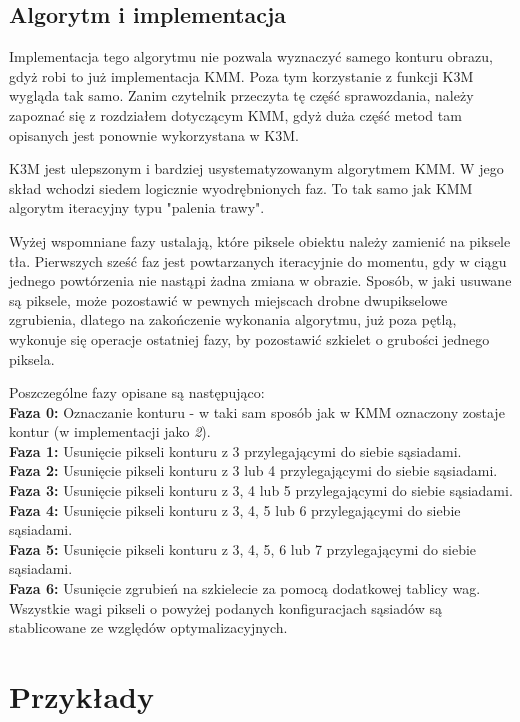 \documentclass[11pt]{article}
\begin{document}
\subsection{Algorytm i implementacja}
\par
Implementacja tego algorytmu nie pozwala wyznaczyć samego konturu obrazu, gdyż robi to już implementacja KMM. Poza tym korzystanie z funkcji K3M wygląda tak samo. Zanim czytelnik przeczyta tę część sprawozdania, należy zapoznać się z rozdziałem dotyczącym KMM, gdyż duża część metod tam opisanych jest ponownie wykorzystana w K3M.
\par
K3M jest ulepszonym i bardziej usystematyzowanym algorytmem KMM. W jego skład wchodzi siedem logicznie wyodrębnionych faz. To tak samo jak KMM algorytm iteracyjny typu "palenia trawy".
\par
Wyżej wspomniane fazy ustalają, które piksele obiektu należy zamienić na piksele tła. Pierwszych sześć faz jest powtarzanych iteracyjnie do momentu, gdy w ciągu jednego powtórzenia nie nastąpi żadna zmiana w obrazie. Sposób, w jaki usuwane są piksele, może pozostawić w pewnych miejscach drobne dwupikselowe zgrubienia, dlatego na zakończenie wykonania algorytmu, już poza pętlą, wykonuje się operacje ostatniej fazy, by pozostawić szkielet o grubości jednego piksela.
\par
Poszczególne fazy opisane są następująco: \\
\textbf{Faza 0:} Oznaczanie konturu - w taki sam sposób jak w KMM oznaczony zostaje kontur (w implementacji jako \textit{2}). \\
\textbf{Faza 1:} Usunięcie pikseli konturu z 3 przylegającymi do siebie sąsiadami. \\
\textbf{Faza 2:} Usunięcie pikseli konturu z 3 lub 4 przylegającymi do siebie sąsiadami. \\
\textbf{Faza 3:} Usunięcie pikseli konturu z 3, 4 lub 5 przylegającymi do siebie sąsiadami. \\
\textbf{Faza 4:} Usunięcie pikseli konturu z 3, 4, 5 lub 6 przylegającymi do siebie sąsiadami. \\
\textbf{Faza 5:} Usunięcie pikseli konturu z 3, 4, 5, 6 lub 7 przylegającymi do siebie sąsiadami. \\
\textbf{Faza 6:} Usunięcie zgrubień na szkielecie za pomocą dodatkowej tablicy wag. \\
Wszystkie wagi pikseli o powyżej podanych konfiguracjach sąsiadów są stablicowane ze względów optymalizacyjnych.

\section{Przykłady}
\end{document}
